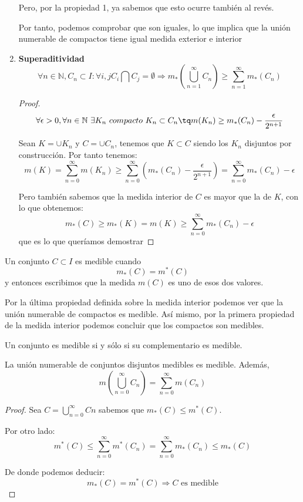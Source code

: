\documentclass{apuntes}
\begin{document}
\begin{enumerate}
Pero, por la propiedad 1, ya sabemos que esto ocurre también al revés.

Por tanto, podemos comprobar que son iguales, lo que implica que la unión numerable de compactos tiene igual medida exterior e interior

%
\item \textbf{Superaditividad}
\[\forall n \in \mathbb{N}, C_n \subset I : \forall i,j C_i \bigcap C_j = \emptyset \Rightarrow m_*(\bigcup_{n=1}^{\infty} C_n) \geq \sum_{n=1}^{\infty}m_*(C_n)\]

\begin{proof}
\[ \forall \epsilon > 0, \forall n \in \mathbb{N} \ \exists K_n \ compacto \ K_n \subset C_n \tq m(K_n) \geq m_*(C_n) - \frac{\epsilon}{2^{n+1}}\]

Sean $K=\cup K_n$ y $C=\cup C_n$, tenemos que $K\subset C$  siendo los $K_n$ disjuntos por construcción. Por tanto tenemos:
\[m(K) = \sum _{n=0}^{\infty}m(K_n) \geq \sum _{n=0}^{\infty}(m_*(C_n)- \frac{\epsilon}{2^{n+1}}) = \sum_{n=0}^{\infty} m_*(C_n) - \epsilon\]

Pero también sabemos que la medida interior de $C$ es mayor que la de $K$, con lo que obtenemos:
\[m_*(C) \geq m_*(K) = m(K) \geq \sum_{n=0}^{\infty} m_*(C_n) - \epsilon\]
que es lo que queríamos demostrar
\end{proof}
\end{enumerate}

\begin{defn}[Medibilidad]
Un conjunto $C \subset I$ es medible cuando
\[m_*(C)=m^*(C)\]
y entonces escribimos que la medida $m(C)$ es uno de esos dos valores.
\end{defn}

Por la última propiedad definida sobre la medida interior podemos ver que la unión numerable de compactos es medible. Así mismo, por la primera propiedad de la medida interior podemos concluir que los compactos son medibles.

\obs Un conjunto es medible si y sólo si su complementario es medible.

\begin{prop} La unión numerable de conjuntos disjuntos medibles es medible. Además, 
\[m\left(\bigcup_{n=0}^{\infty}C_n\right) = \sum_{n=0}^{\infty} m(C_n)\]
\end{prop}
\begin{proof}
Sea $C=\bigcup_{n=0}^{\infty} Cn$  sabemos que $m_*(C) \leq m^*(C)$.

Por otro lado:
\[m^*(C) \leq \sum_{n=0}^{\infty}m^*(C_n) = \sum_{n=0}^{\infty}m_*(C_n) \leq m_*(C) \]

De donde podemos deducir:
\[m_*(C) = m^*(C) \Rightarrow C \text{ es  medible} \]
\end{proof}
\end{document}
